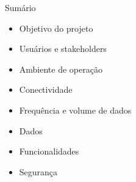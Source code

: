 
\begin{frame}{Sumário}
    \begin{itemize}
        \item Objetivo do projeto
        \item Usuários e stakeholders
        \item Ambiente de operação
        \item Conectividade
        \item Frequência e volume de dados
        \item Dados
        \item Funcionalidades
        \item Segurança
    \end{itemize}
\end{frame}